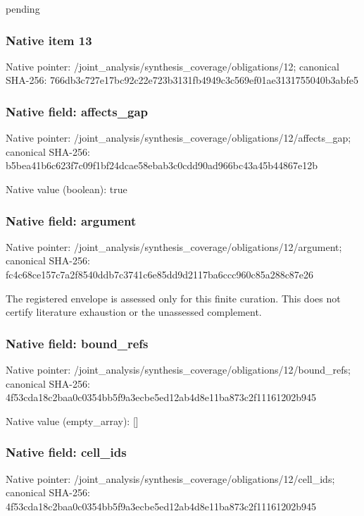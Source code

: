 \documentclass[10pt,a4paper]{article}
\begin{document}
\begingroup\raggedright\sloppy pending\par\endgroup

\subsubsection{Native item 13}
Native pointer: /joint\_\allowbreak{}analysis/synthesis\_\allowbreak{}coverage/obligations/12; canonical SHA-256: 766db3c727e17bc92c22e723b3131fb4949c3c569ef01ae3131755040b3abfe5

\subsubsection{Native field: affects\_\allowbreak{}gap}
Native pointer: /joint\_\allowbreak{}analysis/synthesis\_\allowbreak{}coverage/obligations/12/affects\_\allowbreak{}gap; canonical SHA-256: b5bea41b6c623f7c09f1bf24dcae58ebab3c0cdd90ad966bc43a45b44867e12b

Native value (boolean): true

\subsubsection{Native field: argument}
Native pointer: /joint\_\allowbreak{}analysis/synthesis\_\allowbreak{}coverage/obligations/12/argument; canonical SHA-256: fc4c68ce157c7a2f8540ddb7c3741c6e85dd9d2117ba6ccc960c85a288c87e26

\begingroup\raggedright\sloppy The registered envelope is assessed only for this finite curation. This does not certify literature exhaustion or the unassessed complement.\par\endgroup

\subsubsection{Native field: bound\_\allowbreak{}refs}
Native pointer: /joint\_\allowbreak{}analysis/synthesis\_\allowbreak{}coverage/obligations/12/bound\_\allowbreak{}refs; canonical SHA-256: 4f53cda18c2baa0c0354bb5f9a3ecbe5ed12ab4d8e11ba873c2f11161202b945

Native value (empty\_\allowbreak{}array): []

\subsubsection{Native field: cell\_\allowbreak{}ids}
Native pointer: /joint\_\allowbreak{}analysis/synthesis\_\allowbreak{}coverage/obligations/12/cell\_\allowbreak{}ids; canonical SHA-256: 4f53cda18c2baa0c0354bb5f9a3ecbe5ed12ab4d8e11ba873c2f11161202b945
\end{document}
